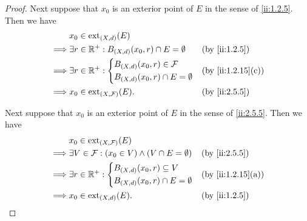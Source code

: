 \begin{proof}
  Next suppose that \(x_0\) is an exterior point of \(E\) in the sense of \cref{ii:1.2.5}.
  Then we have
  \begin{align*}
             & x_0 \in \text{ext}_{(X, d)}(E)                                                \\
    \implies & \exists r \in \R^+ : B_{(X, d)}(x_0, r) \cap E = \emptyset &  & \by{ii:1.2.5} \\
    \implies & \exists r \in \R^+ : \begin{dcases}
                                      B_{(X, d)}(x_0, r) \in \mathcal{F} \\
                                      B_{(X, d)}(x_0, r) \cap E = \emptyset
                                    \end{dcases}                      &  & \by{ii:1.2.15}[c] \\
    \implies & x_0 \in \text{ext}_{(X, \mathcal{F})}(E).                  &  & \by{ii:2.5.5}
  \end{align*}

  Next suppose that \(x_0\) is an exterior point of \(E\) in the sense of \cref{ii:2.5.5}.
  Then we have
  \begin{align*}
             & x_0 \in \text{ext}_{(X, \mathcal{F})}(E)                                                \\
    \implies & \exists V \in \mathcal{F} : (x_0 \in V) \land (V \cap E = \emptyset) &  & \by{ii:2.5.5} \\
    \implies & \exists r \in \R^+ : \begin{dcases}
                                      B_{(X, d)}(x_0, r) \subseteq V \\
                                      B_{(X, d)}(x_0, r) \cap E = \emptyset
                                    \end{dcases}                                &  & \by{ii:1.2.15}[a] \\
    \implies & x_0 \in \text{ext}_{(X, d)}(E).                                      &  & \by{ii:1.2.5}
  \end{align*}


\end{proof}
